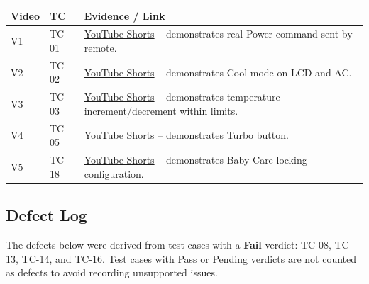 \documentclass[12pt, a4paper]{article}
\begin{document}
\begin{table}[h!]
\centering
\begin{tabularx}{\textwidth}{@{} C{1.5cm} C{1.5cm} X @{}}
\toprule
{}
\textbf{Video} & \textbf{TC} & \textbf{Evidence / Link} \\
\midrule
V1 & TC-01 & \href{https://youtube.com/shorts/sGEjxL-i4Ts?feature=share}{YouTube Shorts} -- demonstrates real Power command sent by remote. \\
V2 & TC-02 & \href{https://youtube.com/shorts/9te5ZgJJPrM?feature=share}{YouTube Shorts} -- demonstrates Cool mode on LCD and AC. \\
V3 & TC-03 & \href{https://youtube.com/shorts/CZnAIcFSs0g?feature=share}{YouTube Shorts} -- demonstrates temperature increment/decrement within limits. \\
V4 & TC-05 & \href{https://youtube.com/shorts/6q_QbNK5G1E?feature=share}{YouTube Shorts} -- demonstrates Turbo button. \\
V5 & TC-18 & \href{https://youtube.com/shorts/wzYjL1a-N4A}{YouTube Shorts} -- demonstrates Baby Care locking configuration. \\
\bottomrule
\end{tabularx}
\end{table}

\subsection{Defect Log}

The defects below were derived from test cases with a \textbf{Fail} verdict: TC-08, TC-13, TC-14, and TC-16. Test cases with Pass or Pending verdicts are not counted as defects to avoid recording unsupported issues.
\end{document}
